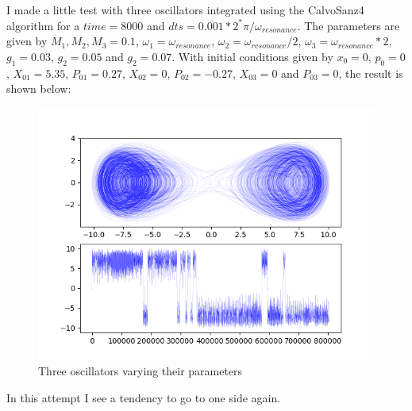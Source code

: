 \documentclass[idxtotoc,hyperref,openany]{labbook} %
\begin{document}
I made a little test with three oscillators integrated using the CalvoSanz4 algorithm for a $time=8000$ and $dts=0.001*2^*\pi / \omega_{resonance}$. The parameters are given by $M_1,M_2,M_3=0.1$, $\omega_1=\omega_{resonance}$, $\omega_2=\omega_{resonance}/2$, $\omega_3=\omega_{resonance}*2$, $g_1=0.03$, $g_2=0.05$ and $g_2=0.07$. With initial conditions given by $x_0=0$, $p_0=0$, $X_01=5.35$, $P_01=0.27$, $X_02=0$, $P_02=-0.27$, $X_03=0$ and $P_03=0$, the result is shown below:
\begin{figure}[H] %
\begin{center}
\includegraphics[width=1\linewidth]{tres_osci_mejorintento.png}
\end{center}
\caption{Three oscillators varying their parameters}
\label{Three_osci_first}
\end{figure}

In this attempt I see a tendency to go to one side again.
\end{document}
